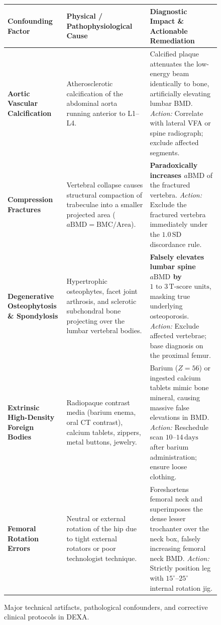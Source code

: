 \documentclass[11pt,a4paper]{article}
\begin{document}
\begin{figure}[htbp]
\centering
\setlength{\tabcolsep}{4pt}
\begin{tabular}{p{3.8cm}p{5.5cm}p{5.5cm}}
\toprule
\textbf{Confounding Factor} & \textbf{Physical / Pathophysiological Cause} & \textbf{Diagnostic Impact \& Actionable Remediation} \\
\midrule
\textbf{Aortic Vascular Calcification} & Atherosclerotic calcification of the abdominal aorta running anterior to L1--L4. & Calcified plaque attenuates the low-energy beam identically to bone, artificially elevating lumbar BMD. \textit{Action:} Correlate with lateral VFA or spine radiograph; exclude affected segments. \\
\addlinespace
\textbf{Compression Fractures} & Vertebral collapse causes structural compaction of trabeculae into a smaller projected area ($a\text{BMD} = \text{BMC}/\text{Area}$). & \textbf{Paradoxically increases $a\text{BMD}$} of the fractured vertebra. \textit{Action:} Exclude the fractured vertebra immediately under the $1.0\,\text{SD}$ discordance rule. \\
\addlinespace
\textbf{Degenerative Osteophytosis \& Spondylosis} & Hypertrophic osteophytes, facet joint arthrosis, and sclerotic subchondral bone projecting over the lumbar vertebral bodies. & \textbf{Falsely elevates lumbar spine $a\text{BMD}$ by $1\text{ to }3\,\text{T-score units}$}, masking true underlying osteoporosis. \textit{Action:} Exclude affected vertebrae; base diagnosis on the proximal femur. \\
\addlinespace
\textbf{Extrinsic High-Density Foreign Bodies} & Radiopaque contrast media (barium enema, oral CT contrast), calcium tablets, zippers, metal buttons, jewelry. & Barium ($Z=56$) or ingested calcium tablets mimic bone mineral, causing massive false elevations in BMD. \textit{Action:} Reschedule scan $10\text{--}14\,\text{days}$ after barium administration; ensure loose clothing. \\
\addlinespace
\textbf{Femoral Rotation Errors} & Neutral or external rotation of the hip due to tight external rotators or poor technologist technique. & Foreshortens femoral neck and superimposes the dense lesser trochanter over the neck box, falsely increasing femoral neck BMD. \textit{Action:} Strictly position leg with $15^\circ\text{--}25^\circ$ internal rotation jig. \\
\bottomrule
\end{tabular}
\caption{Major technical artifacts, pathological confounders, and corrective clinical protocols in DEXA.}
\label{tab:artifacts_pitfalls}
\end{figure}
\end{document}
